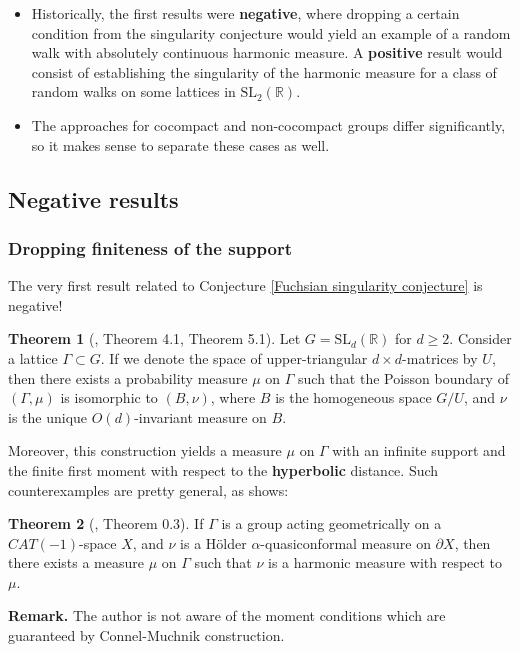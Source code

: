 \documentclass[11pt]{amsart}
\theoremstyle{definition}
\newtheorem{theorem}{Theorem}[section]
\begin{document}
	\begin{itemize}
		\item Historically, the first results were \textbf{negative}, where dropping a certain condition from the singularity conjecture would yield an example of a random walk with absolutely continuous harmonic measure. A \textbf{positive} result would consist of establishing the singularity of the harmonic measure for a class of random walks on some lattices in $\text{SL}_2(\mathbb{R})$.
		\item The approaches for cocompact and non-cocompact groups differ significantly, so it makes sense to separate these cases as well.
	\end{itemize}
	
	\subsection{Negative results}
	\subsubsection{Dropping finiteness of the support}
	The very first result related to Conjecture \ref{Fuchsian singularity conjecture} is negative!
	
	\begin{theorem}[\cite{furstenberg71}, Theorem 4.1, Theorem 5.1]
		Let $G = \mathrm{SL}_d(\mathbb{R})$ for $d \ge 2$. Consider a lattice $\Gamma \subset G$. If we denote the space of upper-triangular $d \times d$-matrices by $U$, then there exists a probability measure $\mu$ on $\Gamma$ such that the Poisson boundary of $(\Gamma, \mu)$ is isomorphic to $(B, \nu)$, where $B$ is the homogeneous space $G / U$, and $\nu$ is the unique $O(d)$-invariant measure on $B$. 
	\end{theorem} 
	
	Moreover, this construction yields a measure $\mu$ on $\Gamma$ with an infinite support and the finite first moment with respect to the \textbf{hyperbolic} distance. Such counterexamples are pretty general, as \cite{connelmuchnik} shows:
	
	\begin{theorem}[\cite{connelmuchnik}, Theorem 0.3]
		If $\Gamma$ is a group acting geometrically on a $CAT(-1)$-space $X$, and $\nu$ is a H\"{o}lder $\alpha$-quasiconformal measure on $\partial X$, then there exists a measure $\mu$ on $\Gamma$ such that $\nu$ is a harmonic measure with respect to $\mu$.
	\end{theorem}
	\textbf{Remark.} The author is not aware of the moment conditions which are guaranteed by Connel-Muchnik construction.
	
\end{document}
